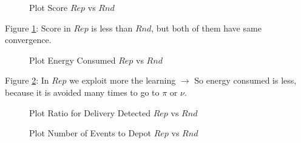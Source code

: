 \documentclass[12pt]{article}
\begin{document}
\begin{figure}[H]
    
    \qquad
    
    \caption{Plot Score $Rep$ vs $Rnd$}
    
    \label{fig:Score}%
\end{figure}

Figure \ref{fig:Score}: Score in $Rep$ is less than $Rnd$, but both of them have same convergence.

\begin{figure}[H]
    
    \qquad
    
    \caption{Plot Energy Consumed $Rep$ vs $Rnd$}
    
    \label{fig:Energy}%
\end{figure}

Figure \ref{fig:Energy}: In $Rep$ we exploit more the learning $\rightarrow$ So energy consumed is less, because it is avoided many times to go to $\pi$ or $\nu$.

\begin{figure}[H]
    
    \qquad
    
    \caption{Plot Ratio for Delivery Detected $Rep$ vs $Rnd$}
    
    
    \label{fig:Ratio}%
\end{figure}

\begin{figure}[H]
    
    \qquad
    
    \caption{Plot Number of Events to Depot $Rep$ vs $Rnd$}
    
    \label{fig:Number_Events}%
\end{figure}
\end{document}
